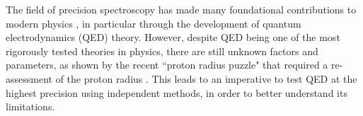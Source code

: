 \documentclass[%
 reprint,
 amsmath,amssymb,
 aps,
 prl,
]{revtex4-2}
\newcommand{\brycecom}[1]{{\color{ProcessBlue}[{#1}]\normalcolor}} %
\begin{document}
The field of precision spectroscopy has made many foundational contributions to modern physics \cite{PhysRev.21.483,Landsberg1928,RAMAN1928,Lamb1947}, in particular through the development of quantum electrodynamics (QED) theory.
However, despite QED being one of the most rigorously tested theories in physics, there are still unknown factors and parameters, as shown by the recent ``proton radius puzzle" that required a re-assessment of the proton radius \cite{Pohl2010,Antognini417,Bezginov1007,Xiong2019}. This leads to an imperative to test QED at the highest precision using independent methods, in order to better understand its limitations.
\end{document}
